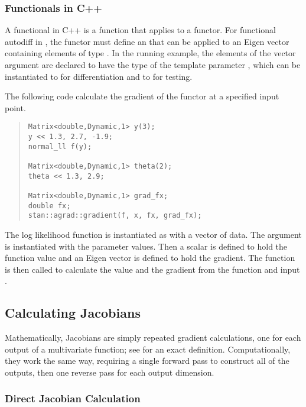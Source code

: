 \documentclass[10pt]{article}
\begin{document}
\subsubsection{Functionals in C++}

A functional in C++ is a function that applies to a functor.  For
functional autodiff in , the functor must define an
 that can be applied to an Eigen vector containing
elements of type .  In the running example, the
elements of the vector argument are declared to have the type of the
template parameter , which can be instantiated to
 for differentiation and to  for
testing.

The following code calculate the gradient of the functor at a
specified input point.
%
\begin{quote}
\begin{Verbatim}
Matrix<double,Dynamic,1> y(3);
y << 1.3, 2.7, -1.9;
normal_ll f(y);

Matrix<double,Dynamic,1> theta(2);
theta << 1.3, 2.9;

Matrix<double,Dynamic,1> grad_fx;
double fx;
stan::agrad::gradient(f, x, fx, grad_fx);
\end{Verbatim}
\end{quote}
%
The log likelihood function is instantiated as  with a vector
of data.  The argument  is instantiated with the parameter
values.  Then a scalar  is defined to hold the function value
and an Eigen vector  is defined to hold the gradient.
The function  is then called to calculate the value and
the gradient from the function  and input .







\subsection{Calculating Jacobians}

Mathematically, Jacobians are simply repeated gradient calculations,
one for each output of a multivariate function; see
 for an exact definition.
Computationally, they work the same way, requiring a single forward
pass to construct all of the outputs, then one reverse pass for each
output dimension.

\subsubsection{Direct Jacobian Calculation}
\end{document}
